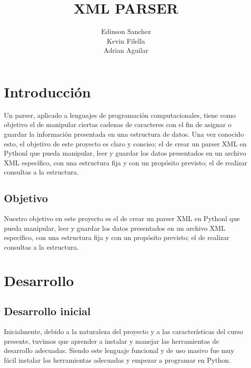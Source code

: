 \documentclass[11pt]{article} %
\title{XML PARSER}
\author{Edinson Sanchez\\Kevin Filella\\Adrian Aguilar}
\begin{document}
\maketitle



\newpage
\tableofcontents
\newpage

\section{Introducción}
Un parser, aplicado a lenguajes de programación computacionales, tiene como objetivo el de manipular ciertas cadenas de caracteres con el fin de asignar o guardar la información presentada en una estructura de datos.
Una vez conocido esto, el objetivo de este proyecto es claro y conciso; el de crear un parser XML en Pythonl que pueda manipular, leer y guardar los datos presentados en un archivo XML específico, con una estructura fija y con un propósito previsto; el de realizar consultas a la estructura.


\subsection{Objetivo}
Nuestro objetivo en este proyecto es el de crear un parser XML en Pythonl que pueda manipular, leer y guardar los datos presentados en un archivo XML específico, con una estructura fija y con un propósito previsto; el de realizar consultas a la estructura.

\section{Desarrollo}
\subsection{Desarrollo inicial}
Inicialmente, debido a la naturaleza del proyecto y a las características del curso presente, tuvimos que aprender a instalar y manejar las herramientas de desarrollo adecuadas. Siendo este lenguaje funcional y de uso masivo fue muy fácil instalar las herramientas adecuadas y empezar a programar en Python.
\end{document}
